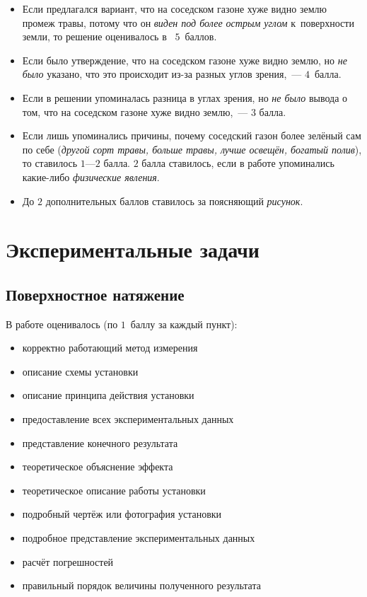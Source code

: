 \documentclass[10pt, a4paper, oneside, fleqn]{article}
\newcommand\т{~--- }
\newenvironment{items}
{\begin{itemize}%
\setlength{\itemsep}{-1pt}}
{\end{itemize}}
\begin{document}
\begin{items}
\item Если предлагался вариант, что на соседском газоне хуже видно землю промеж травы, потому что он
\emph{виден под более острым углом} к~поверхности земли, то решение оценивалось в~ $5$~баллов.
\item Если было утверждение, что на соседском газоне хуже видно землю,
но \emph{не было} указано, что это происходит из-за разных углов зрения,\т $4$~балла.
\item Если в решении упоминалась разница в углах зрения, но \emph{не было} вывода о том,
что на соседском газоне хуже видно землю,\т $3$ балла.
\item Если лишь упоминались причины, почему соседский газон более зелёный
сам по себе (\emph{другой сорт травы, больше травы, лучше освещён, богатый полив}), то ставилось $1$---$2$ балла.
$2$ балла ставилось, если в работе упоминались какие-либо \emph{физические явления}.
\item До $2$ дополнительных баллов ставилось за поясняющий \emph{рисунок}.
\end{items}

\section{Экспериментальные задачи}

\subsection{Поверхностное натяжение}

В работе оценивалось (по $1$~баллу за каждый пункт):
\begin{items}
\item корректно работающий метод измерения
\item описание схемы установки
\item описание принципа действия установки
\item предоставление всех экспериментальных данных
\item представление конечного результата
\item теоретическое объяснение эффекта
\item теоретическое описание работы установки
\item подробный чертёж или фотография установки
\item подробное представление экспериментальных данных
\item расчёт погрешностей
\item правильный порядок величины полученного результата
\end{items}
\end{document}
